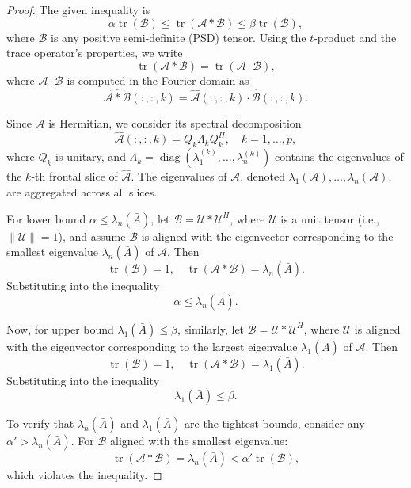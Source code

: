 \documentclass[oupthm]{CUP-JNL-BCM}%
\theoremstyle{oupplain}
\theoremstyle{oupdefinition}
\theoremstyle{oupremark}
\theoremstyle{oupproof}
\newtheorem{proof}{Proof}
\numberwithin{equation}{section}
\begin{document}
\begin{proof}
    The given inequality is
    \[
    \alpha \operatorname{tr}(\mathcal{B}) \leq \operatorname{tr}(\mathcal{A} * \mathcal{B}) \leq \beta \operatorname{tr}(\mathcal{B}),
    \]
    where $\mathcal{B}$ is any positive semi-definite (PSD) tensor. Using the $t$-product and the trace operator's properties, we write
    \[
    \operatorname{tr}(\mathcal{A} * \mathcal{B}) = \operatorname{tr}(\mathcal{A} \cdot \mathcal{B}),
    \]
    where $\mathcal{A} \cdot \mathcal{B}$ is computed in the Fourier domain as
    \[
    \widehat{\mathcal{A} * \mathcal{B}}(:, :, k) = \widehat{\mathcal{A}}(:, :, k) \cdot \widehat{\mathcal{B}}(:, :, k).
    \]

   \noindent Since $\mathcal{A}$ is Hermitian, we consider its spectral decomposition
    \[
    \widehat{\mathcal{A}}(:, :, k) = Q_k \Lambda_k Q_k^H, \quad k = 1, \ldots, p,
    \]
    where $Q_k$ is unitary, and $\Lambda_k = \operatorname{diag}(\lambda_1^{(k)}, \ldots, \lambda_n^{(k)})$ contains the eigenvalues of the $k$-th frontal slice of $\widehat{\mathcal{A}}$. The eigenvalues of $\mathcal{A}$, denoted $\lambda_1(\mathcal{A}), \ldots, \lambda_n(\mathcal{A})$, are aggregated across all slices.

  \noindent For lower bound $\alpha \leq \lambda_n(\bar{A})$,
    let $\mathcal{B} = \mathcal{U}*\mathcal{U}^H$, where $\mathcal{U}$ is a unit tensor (i.e., $\|\mathcal{U}\| = 1$), and assume $\mathcal{B}$ is aligned with the eigenvector corresponding to the smallest eigenvalue $\lambda_n(\bar{A})$ of $\mathcal{A}$. Then
    \[
    \operatorname{tr}(\mathcal{B}) = 1, \quad \operatorname{tr}(\mathcal{A} * \mathcal{B}) = \lambda_n(\bar{A}).
    \]
    Substituting into the inequality
    \[
    \alpha \leq \lambda_n(\bar{A}).
    \]

  \noindent Now, for upper bound $\lambda_1(\bar{A}) \leq \beta$,  
    similarly, let $\mathcal{B} = \mathcal{U}*\mathcal{U}^H$, where $\mathcal{U}$ is aligned with the eigenvector corresponding to the largest eigenvalue $\lambda_1(\bar{A})$ of $\mathcal{A}$. Then
    \[
    \operatorname{tr}(\mathcal{B}) = 1, \quad \operatorname{tr}(\mathcal{A} * \mathcal{B}) = \lambda_1(\bar{A}).
    \]
    Substituting into the inequality
    \[
    \lambda_1(\bar{A}) \leq \beta.
    \]
 
   \noindent To verify that $\lambda_n(\bar{A})$ and $\lambda_1(\bar{A})$ are the tightest bounds, consider any $\alpha' > \lambda_n(\bar{A})$. For $\mathcal{B}$ aligned with the smallest eigenvalue:
    \[
    \operatorname{tr}(\mathcal{A} * \mathcal{B}) = \lambda_n(\bar{A}) < \alpha' \operatorname{tr}(\mathcal{B}),
    \]
    which violates the inequality.


\end{proof}
\end{document}
